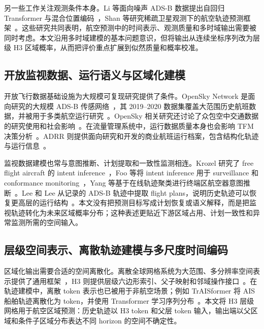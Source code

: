 另一些工作关注观测条件本身。Li 等面向噪声 ADS-B 数据提出自回归 Transformer 与混合位置编码~\cite{li2025noiserobust}，Shan 等研究稀疏卫星观测下的航空轨迹预测框架~\cite{shan2025sparse}。这些研究共同表明，航空预测中的时间表示、观测质量和多时域输出需要被同时考虑。本文沿用多时域建模的基本问题意识，但将输出从连续坐标序列改为层级 H3 区域概率，从而把评价重点扩展到似然质量和概率校准。

\subsection{开放监视数据、运行语义与区域化建模}

开放飞行数据基础设施为大规模可复现研究提供了条件。OpenSky Network 是面向研究的大规模 ADS-B 传感网络~\cite{opensky2014}，其 2019--2020 数据集覆盖大范围历史航班数据，并被用于多类航空运行研究~\cite{strohmeier2021crowdsourced}。OpenSky 相关研究还讨论了众包空中交通数据的研究使用和社会影响~\cite{strohmeier2020research_usage}。在流量管理系统中，运行数据质量本身也会影响 TFM 决策分析~\cite{chatterji2003etms_quality}。ADRR 则提供面向研究和开发的商业航班运行档案，包含结构化轨迹与运行信息~\cite{eurocontrol_adrr_2025}。

监视数据建模也常与意图推断、计划提取和一致性监测相连。Krozel 研究了 free flight aircraft 的 intent inference~\cite{krozel2000intent_inference}，Foo 等将 intent inference 用于 surveillance 和 conformance monitoring~\cite{foo2007intent_conformance}，Yang 等基于在线轨迹聚类进行终端区航空器意图推断~\cite{yang2015terminal_intent}。Lee 和 Lee 从记录的 ADS-B 轨迹中提取 flight plans，说明历史轨迹可以恢复更高层的运行结构~\cite{lee2022extracting_flight_plans}。本文没有把预测目标写成计划恢复或语义解释，而是把监视轨迹转化为未来区域概率分布；这种表述更贴近下游区域占用、计划一致性和异常监测所需的空间输入。

\subsection{层级空间表示、离散轨迹建模与多尺度时间编码}

区域化输出需要合适的空间离散化。离散全球网格系统为大范围、多分辨率空间表示提供了通用框架~\cite{sahr2003gdggs}，H3 则提供层级六边形索引、父子映射和邻域操作接口~\cite{h3docs2025}。在轨迹建模中，离散 token 表示也已被用于非航空场景；例如 TrAISformer 将 AIS 船舶轨迹离散化为 token，并使用 Transformer 学习序列分布~\cite{nguyen_traisformer_2021}。本文将 H3 层级网格用于航空区域预测：历史轨迹以 H3 token 和父层 token 输入，输出端以父区域和条件子区域分布表达不同 horizon 的空间不确定性。

